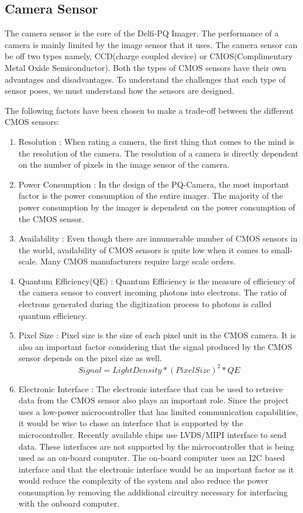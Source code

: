 \subsection{Camera Sensor}
The camera sensor is the core of the Delfi-PQ Imager. The performance of a camera is mainly limited by the image sensor that it uses\cite{cmos}. The camera sensor can be off two types namely, CCD(charge coupled device) or CMOS(Complimentary Metal Oxide Semiconductor). Both the types of CMOS sensors have their own advantages and disadvantages. To understand the challenges that each type of sensor poses, we must understand how the sensors are designed.

The following factors have been chosen to  make a trade-off between the different CMOS sensors:
\begin{enumerate}
\item Resolution : When rating a camera, the first thing that comes to the mind is the resolution of the camera. The resolution of a camera is directly dependent on the number of pixels in the image sensor of the camera. 
\item Power Consumption : In the design of the PQ-Camera, the most important factor is the power consumption of the entire imager. The majority of the power consumption by the imager is dependent on the power consumption of the CMOS sensor. 
\item Availability : Even though there are innumerable number of CMOS sensors in the world, availability of CMOS sensors is quite low when it comes to small-scale. Many CMOS manufacturers require large scale orders.
\item Quantum Efficiency(QE) : Quantum Efficiency is the measure of efficiency of the camera sensor to convert incoming photons into electrons. The ratio of electrons generated during the digitization process to photons is called quantum efficiency.
\item Pixel Size : Pixel size is the size of each pixel unit in the CMOS camera. It is also an important factor considering that the signal produced by the CMOS sensor depends on the pixel size as well.
$$
Signal = Light Density * (Pixel Size)^2 * QE
$$
\item Electronic Interface : The electronic interface that can be used to retreive data from the CMOS sensor also plays an important role. Since the project uses a low-power microcontroller that has limited communication capabilities, it would be wise to chose an interface that is supported by the microcontroller. Recently available chips use LVDS/MIPI interface to send data. These interfaces are not supported by the microcontroller that is being used as an on-board computer. The on-board computer uses an I2C based interface and that the electronic interface would be an important factor as it would reduce the complexity of the system and also reduce the power consumption by removing the addidional circuitry necessary for interfacing with the onboard computer.


\end{enumerate}
